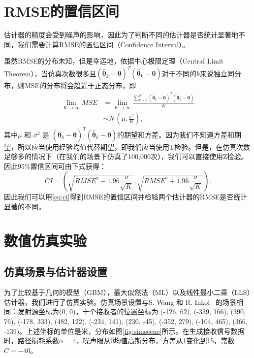\section{RMSE的置信区间}

估计器的精度会受到噪声的影响，因此为了判断不同的估计器是否统计显著地不同，我们需要计算RMSE的置信区间（Confidence Interval）。

虽然RMSE的分布未知，但是幸运地，依据中心极限定理（Central Limit Theorem），当仿真次数很多且$({\widehat{\bm{\theta}}_k - \bm{\theta}})^T({\widehat{\bm{\theta}}_k - \bm{\theta}})$对于不同的$k$来说独立同分布，则MSE的分布将会趋近于正态分布，即
\begin{equation}
\begin{split}
\mathop{\mathrm{lim}}\limits_{K\rightarrow\infty}MSE &= \mathop{\mathrm{lim}}\limits_{K\rightarrow\infty} \frac{\sum\limits_{k=1}^K({\widehat{\bm{\theta}}_k - \bm{\theta}})^T({\widehat{\bm{\theta}}_k - \bm{\theta}})}{K} \\
&\sim \mathcal{N}(\mu, \frac{\sigma^2}{K}),
\end{split}
\end{equation}
其中$\mu$ 和 ${\sigma}^2$ 是 $({\widehat{\bm{\theta}}_k - \bm{\theta}})^T({\widehat{\bm{\theta}}_k - \bm{\theta}})$的期望和方差。因为我们不知道方差和期望，所以应当使用经验均值代替期望，即我们应当使用T检验。但是，在仿真次数足够多的情况下（在我们的场景下仿真了100,000次），我们可以直接使用Z检验。因此$95\%$置信区间可由下式获得：
\begin{equation}
CI = (\sqrt{RMSE^2 - 1.96\frac{\sigma}{\sqrt{K}}}, \sqrt{RMSE^2 + 1.96\frac{\sigma}{\sqrt{K}}}). \label{eq:ci}
\end{equation}
因此我们可以用\eqref{eq:ci}得到RMSE的置信区间并检验两个估计器的RMSE是否统计显著的不同。

\section{数值仿真实验}

\subsection{仿真场景与估计器设置}

为了比较基于几何的模型（GBM），最大似然法（ML）以及线性最小二乘（LLS）估计器，我们进行了仿真实验。仿真场景设置与S. Wang 和 R. Inkol~\cite{wang2011near} 的场景相同：发射源坐标为(0, 0)，十个接收者的位置坐标为 (-126, 62), (-339, 166), (390, 76), (-178, 333), (482, 122), (-234, 141), (230, -45), (-352, 279), (-104, 465), (366, -139)。上述坐标的单位是米，分布如图\ref{fig:simscene}所示。在生成接收信号数据时，路径损耗系数$\alpha=4$，噪声服从0均值高斯分布，方差从1变化到15，常数$C=-40$。

